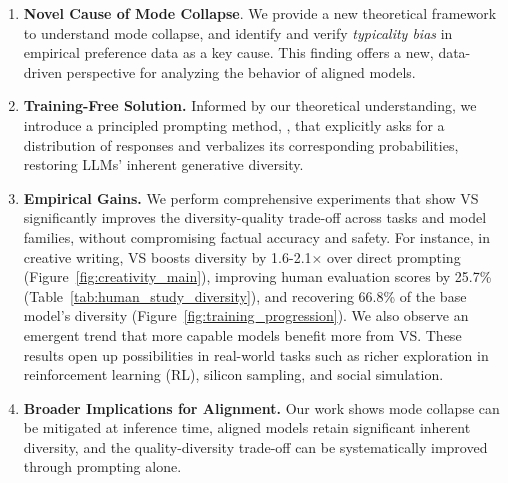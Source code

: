 \begin{enumerate}[leftmargin=15pt, labelwidth=10pt, align=left]
    \item \textbf{Novel Cause of Mode Collapse}. We provide a new theoretical  framework to understand mode collapse, and identify and verify \textit{typicality bias} in empirical preference data as a key cause. %
    This finding offers a new, data-driven perspective for analyzing the behavior of aligned models. %
    

    \item \textbf{Training-Free Solution.} Informed by our theoretical understanding, we introduce a principled prompting method, \textit{\ours}, that explicitly asks for a distribution of responses and verbalizes its corresponding probabilities, restoring LLMs' inherent generative diversity. %
    \item \textbf{Empirical Gains.} We perform comprehensive experiments that show VS significantly improves the diversity-quality trade-off across tasks and model families, without compromising factual accuracy and safety. For instance, in creative writing, VS boosts diversity by 1.6-2.1$\times$ over direct prompting (Figure~\ref{fig:creativity_main}), improving human evaluation scores by 25.7\% (Table~\ref{tab:human_study_diversity}), and recovering 66.8\% of the base model's diversity (Figure~\ref{fig:training_progression}). %
    We also observe an emergent trend that more capable models benefit more from VS. These results open up possibilities in real-world tasks such as richer exploration in reinforcement learning (RL), silicon sampling, and social simulation.
    \item \textbf{Broader Implications for Alignment.} Our work shows mode collapse can be mitigated at inference time, aligned models retain significant inherent diversity, and the quality-diversity trade-off can be systematically improved through prompting alone.




\end{enumerate}
